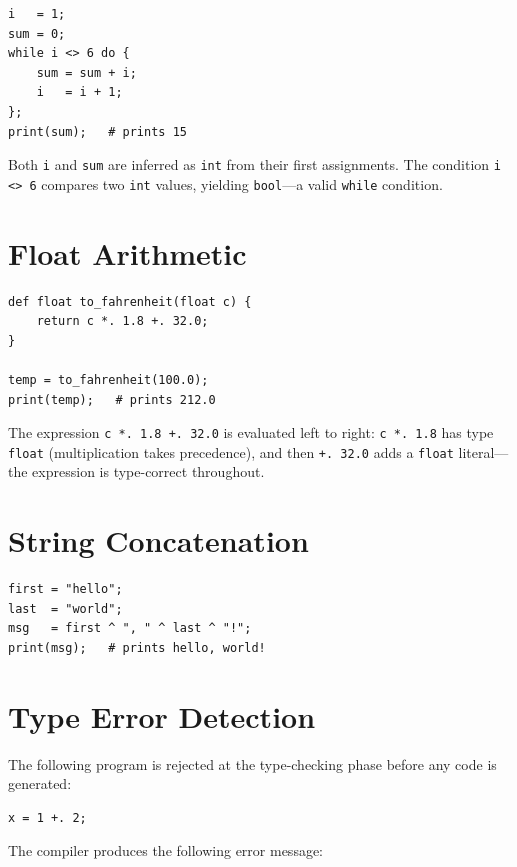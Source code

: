 \documentclass[12pt,a4paper]{report}
\newcommand{\tint}{\texttt{int}}
\newcommand{\tfloat}{\texttt{float}}
\newcommand{\tbool}{\texttt{bool}}
\begin{document}
\begin{lstlisting}[caption={Computing the sum $1 + 2 + \cdots + 5$ iteratively.}]
i   = 1;
sum = 0;
while i <> 6 do {
    sum = sum + i;
    i   = i + 1;
};
print(sum);   # prints 15
\end{lstlisting}

Both \texttt{i} and \texttt{sum} are inferred as \tint{} from their first
assignments. The condition \texttt{i <> 6} compares two \tint{} values,
yielding \tbool{}---a valid \texttt{while} condition.

\section{Float Arithmetic}

\begin{lstlisting}[caption={Celsius-to-Fahrenheit conversion.}]
def float to_fahrenheit(float c) {
    return c *. 1.8 +. 32.0;
}

temp = to_fahrenheit(100.0);
print(temp);   # prints 212.0
\end{lstlisting}

The expression \texttt{c *. 1.8 +. 32.0} is evaluated left to right:
\texttt{c *. 1.8} has type \tfloat{} (multiplication takes precedence),
and then \texttt{+. 32.0} adds a \tfloat{} literal---the expression is
type-correct throughout.

\section{String Concatenation}

\begin{lstlisting}[caption={String concatenation with the \texttt{\^{}} operator.}]
first = "hello";
last  = "world";
msg   = first ^ ", " ^ last ^ "!";
print(msg);   # prints hello, world!
\end{lstlisting}

\section{Type Error Detection}

The following program is rejected at the type-checking phase before any code
is generated:

\begin{lstlisting}[caption={Program rejected by the type checker.}]
x = 1 +. 2;
\end{lstlisting}

The compiler produces the following error message:
\end{document}
